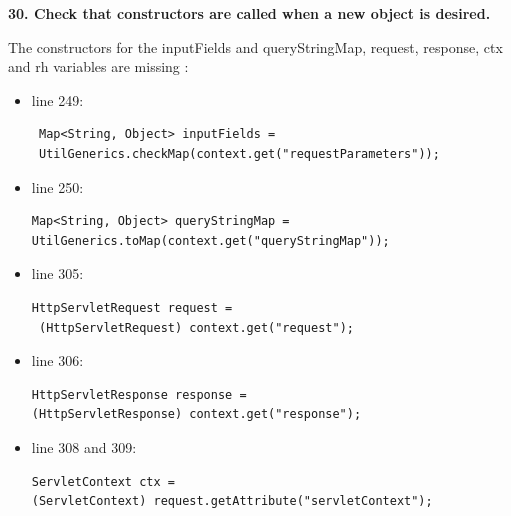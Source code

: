 \documentclass{article}
\begin{document}
\begin{flushleft}
\textbf{30. Check that constructors are called when a new object is desired.}\\
\vspace{0.5cm}

The constructors for the inputFields and queryStringMap, request, response, ctx and rh variables are missing :\\
\vspace{0.5cm}
\begin{itemize}

\item{ line 249:} \\
\vspace{0.5cm}
\begin{lstlisting}
 Map<String, Object> inputFields = 
 UtilGenerics.checkMap(context.get("requestParameters"));
\end{lstlisting}
\vspace{0.5cm}
 
 \item{ line 250:}  \\
 \vspace{0.5cm}
\begin{lstlisting}
Map<String, Object> queryStringMap = 
UtilGenerics.toMap(context.get("queryStringMap"));
\end{lstlisting}
\vspace{0.5cm}


\item{ line 305:} \\
\vspace{0.5cm}
\begin{lstlisting}
HttpServletRequest request =
 (HttpServletRequest) context.get("request");
\end{lstlisting}
\vspace{0.5cm}

\item{ line 306:}  \\
\vspace{0.5cm}
\begin{lstlisting}
HttpServletResponse response = 
(HttpServletResponse) context.get("response");
\end{lstlisting}
\vspace{0.5cm}

\item{ line 308 and 309:}\\
\vspace{0.5cm}
\begin{lstlisting}
ServletContext ctx = 
(ServletContext) request.getAttribute("servletContext");


\end{lstlisting}
\end{itemize}
\end{flushleft}
\end{document}
